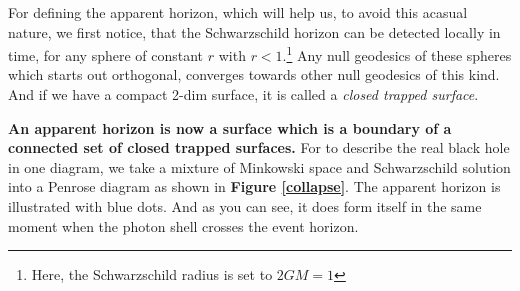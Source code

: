 	For defining the apparent horizon, which will help us, to avoid this acasual nature, we first notice, that the Schwarzschild horizon can be detected locally in time, for any sphere of constant $r$ with $r<1$.\footnote{Here, the Schwarzschild radius is set to $2GM=1$}
	Any null geodesics of these spheres which starts out orthogonal, converges towards other null geodesics of this kind. And if we have a compact 2-dim surface, it is called a \textit{closed trapped surface}.
	
	\textbf{An apparent horizon is now a surface which is a boundary of a connected set of closed trapped surfaces.}
	For to describe the real black hole in one diagram, we take a mixture of Minkowski space and Schwarzschild solution into a Penrose diagram as shown in \textbf{Figure \ref{collapse}}. The apparent horizon is illustrated with blue dots. And as you can see, it does form itself in the same moment when the photon shell crosses the event horizon.
				